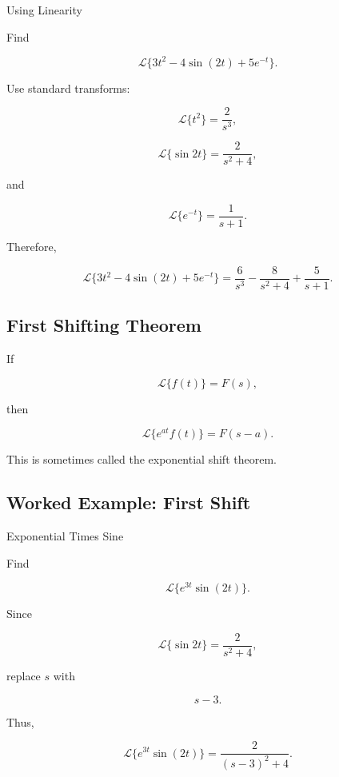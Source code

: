 \begin{workedexamplebox}{Using Linearity}

Find

\[
\mathcal{L}
\{
3t^2-4\sin(2t)+5e^{-t}
\}.
\]

Use standard transforms:

\[
\mathcal{L}\{t^2\}
=
\frac2{s^3},
\]

\[
\mathcal{L}\{\sin 2t\}
=
\frac2{s^2+4},
\]

and

\[
\mathcal{L}\{e^{-t}\}
=
\frac1{s+1}.
\]

Therefore,

\begin{answerbox}
\[
\boxed{
\mathcal{L}
\{
3t^2-4\sin(2t)+5e^{-t}
\}
=
\frac6{s^3}
-
\frac8{s^2+4}
+
\frac5{s+1}.
}
\]
\end{answerbox}

\end{workedexamplebox}

\subsection{First Shifting Theorem}
\label{subsec:first-shifting-theorem}

If

\[
\mathcal{L}\{f(t)\}
=
F(s),
\]

then

\[
\boxed{
\mathcal{L}
\{
e^{at}f(t)
\}
=
F(s-a).
}
\]

This is sometimes called the exponential shift theorem.

\subsection{Worked Example: First Shift}
\label{subsec:worked-first-shift}

\begin{workedexamplebox}{Exponential Times Sine}

Find

\[
\mathcal{L}
\{
e^{3t}\sin(2t)
\}.
\]

Since

\[
\mathcal{L}\{\sin 2t\}
=
\frac2{s^2+4},
\]

replace \(s\) with

\[
s-3.
\]

Thus,

\begin{answerbox}
\[
\boxed{
\mathcal{L}
\{
e^{3t}\sin(2t)
\}
=
\frac2{
(s-3)^2+4
}.
}
\]
\end{answerbox}

\end{workedexamplebox}

